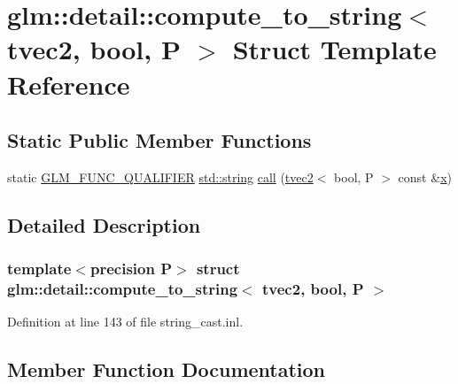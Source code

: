 \hypertarget{structglm_1_1detail_1_1compute__to__string_3_01tvec2_00_01bool_00_01_p_01_4}{}\section{glm\+::detail\+::compute\+\_\+to\+\_\+string$<$ tvec2, bool, P $>$ Struct Template Reference}
\label{structglm_1_1detail_1_1compute__to__string_3_01tvec2_00_01bool_00_01_p_01_4}
\subsection*{Static Public Member Functions}
\begin{DoxyCompactItemize}
\item 
static \mbox{\hyperlink{setup_8hpp_a33fdea6f91c5f834105f7415e2a64407}{G\+L\+M\+\_\+\+F\+U\+N\+C\+\_\+\+Q\+U\+A\+L\+I\+F\+I\+ER}} \mbox{\hyperlink{glad_8h_ac83513893df92266f79a515488701770}{std\+::string}} \mbox{\hyperlink{structglm_1_1detail_1_1compute__to__string_3_01tvec2_00_01bool_00_01_p_01_4_a860277b13f804aa978482f1bed3de777}{call}} (\mbox{\hyperlink{structglm_1_1tvec2}{tvec2}}$<$ bool, P $>$ const \&\mbox{\hyperlink{glad_8h_a92d0386e5c19fb81ea88c9f99644ab1d}{x}})
\end{DoxyCompactItemize}


\subsection{Detailed Description}
\subsubsection*{template$<$precision P$>$\newline
struct glm\+::detail\+::compute\+\_\+to\+\_\+string$<$ tvec2, bool, P $>$}



Definition at line 143 of file string\+\_\+cast.\+inl.



\subsection{Member Function Documentation}
\mbox{\label{structglm_1_1detail_1_1compute__to__string_3_01tvec2_00_01bool_00_01_p_01_4_a860277b13f804aa978482f1bed3de777}} 
